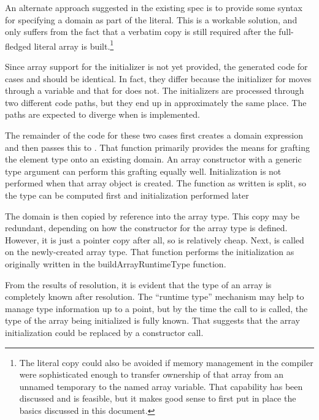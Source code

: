 An alternate approach suggested in
the existing spec is to provide some syntax for specifying a domain as part of the literal.  
This is a workable solution, and only suffers from the fact that a verbatim copy is still
required after the full-fledged literal array is built.\footnote{The literal copy could also
  be avoided if memory management in the compiler were sophisticated enough to transfer
  ownership of that array from an unnamed temporary to the named array variable.  That
  capability has been discussed and is feasible, but it makes good sense to first put
  in place the basics discussed in this document.}

Since array support for the  initializer is not yet provided, the generated code for
cases  and  should be identical.  In fact, they differ because the
initializer for  moves through a  variable and that for 
does not.  The initializers are processed through two different code paths, but they end
up in approximately the same place.  The paths are expected to diverge when 
is implemented.

The remainder of the code for these two cases first creates a domain expression and then
passes this to .  That function primarily provides the
means for grafting the element type onto an existing domain.  An array constructor with a
generic type argument can perform this grafting equally well.  Initialization is not
performed when that array object is created.  The function as written is split, so the
type can be computed first and initialization performed later

The domain is then copied by reference into the array type.  This copy may be redundant,
depending on how the constructor for the array type is defined.  However, it is just a
pointer copy after all, so is relatively cheap.  Next,
 is called on the newly-created array type.  That
function performs the initialization as originally written in the buildArrayRuntimeType
function.

From the results of resolution, it is evident that the type of an array is completely
known after resolution.  The ``runtime type'' mechanism may help to manage type
information up to a point, but by the time the call to
 is called, the type of the array being initialized
is fully known.  That suggests that the array initialization could be replaced by a
constructor call.


